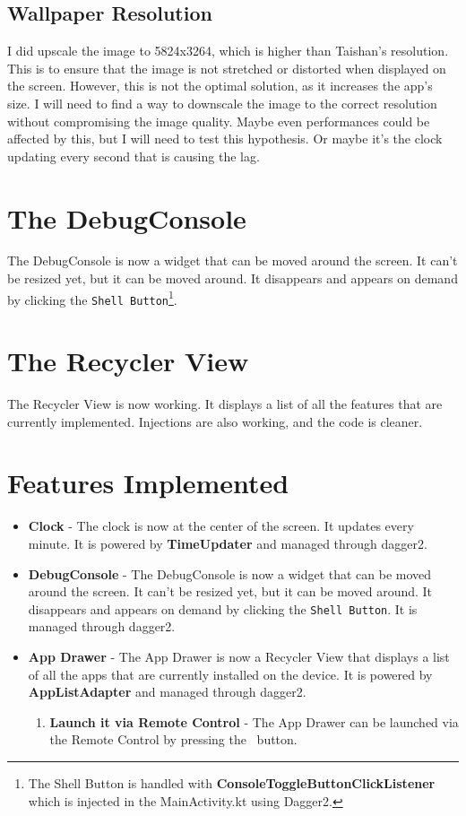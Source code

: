 \subsection{Wallpaper Resolution}
I did upscale the image to 5824x3264, which is higher than Taishan's resolution. This is to ensure that the image is not stretched or distorted when displayed on the screen. However, this is not the optimal solution, as it increases the app's size. I will need to find a way to downscale the image to the correct resolution without compromising the image quality.
Maybe even performances could be affected by this, but I will need to test this hypothesis. Or maybe it's the clock updating every second that is causing the lag.

\section{The DebugConsole}
The DebugConsole is now a widget that can be moved around the screen. It can't be resized yet, but it can be moved around. It disappears and appears on demand by clicking the \texttt{Shell Button}\footnote{The Shell Button is handled with \textbf{ConsoleToggleButtonClickListener} which is injected in the MainActivity.kt using Dagger2.}.

\section{The Recycler View}
The Recycler View is now working. It displays a list of all the features that are currently implemented. Injections are also working, and the code is cleaner.

\section{Features Implemented}
\begin{itemize}
    \item \textbf{Clock} - The clock is now at the center of the screen. It updates every minute. It is powered by \textbf{TimeUpdater} and managed through \gls{dagger2}.
    \item \textbf{DebugConsole} - The DebugConsole is now a widget that can be moved around the screen. It can't be resized yet, but it can be moved around. It disappears and appears on demand by clicking the \texttt{Shell Button}. It is managed through \gls{dagger2}.
    \item \textbf{App Drawer} - The App Drawer is now a Recycler View that displays a list of all the apps that are currently installed on the device. It is powered by \textbf{AppListAdapter} and managed through \gls{dagger2}.
    \begin{enumerate}
        \item \textbf{Launch it via Remote Control} - The App Drawer can be launched via the Remote Control by pressing the \faWindows\ button.
    \end{enumerate}
\end{itemize}